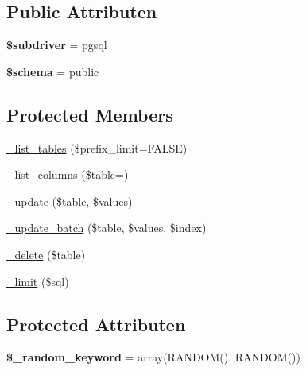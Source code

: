 \subsection*{Public Attributen}
\begin{DoxyCompactItemize}
\item 
\mbox{\label{class_c_i___d_b__pdo__pgsql__driver_a1322ca756348b11d080cb7a4f590de15}} 
{\bfseries \$subdriver} = \textquotesingle{}pgsql\textquotesingle{}
\item 
\mbox{\label{class_c_i___d_b__pdo__pgsql__driver_a83022b1d70799d2bde3d64dca9cb40ee}} 
{\bfseries \$schema} = \textquotesingle{}public\textquotesingle{}
\end{DoxyCompactItemize}
\subsection*{Protected Members}
\begin{DoxyCompactItemize}
\item 
\mbox{\hyperlink{class_c_i___d_b__pdo__pgsql__driver_a435c0f3ce54fe7daa178baa8532ebd54}{\+\_\+list\+\_\+tables}} (\$prefix\+\_\+limit=F\+A\+L\+SE)
\item 
\mbox{\hyperlink{class_c_i___d_b__pdo__pgsql__driver_a7ccb7f9c301fe7f0a9db701254142b63}{\+\_\+list\+\_\+columns}} (\$table=\textquotesingle{}\textquotesingle{})
\item 
\mbox{\hyperlink{class_c_i___d_b__pdo__pgsql__driver_a2540b03a93fa73ae74c10d0e16fc073e}{\+\_\+update}} (\$table, \$values)
\item 
\mbox{\hyperlink{class_c_i___d_b__pdo__pgsql__driver_a336b9ebb119e47b6a84bb7fc9d4dae93}{\+\_\+update\+\_\+batch}} (\$table, \$values, \$index)
\item 
\mbox{\hyperlink{class_c_i___d_b__pdo__pgsql__driver_a133ea8446ded52589bd22cc9163d0896}{\+\_\+delete}} (\$table)
\item 
\mbox{\hyperlink{class_c_i___d_b__pdo__pgsql__driver_a3a02ea06541b8ecc25a33a61651562c8}{\+\_\+limit}} (\$sql)
\end{DoxyCompactItemize}
\subsection*{Protected Attributen}
\begin{DoxyCompactItemize}
\item 
\mbox{\label{class_c_i___d_b__pdo__pgsql__driver_a10213aa6e05f6d924d3277bb1d2fea00}} 
{\bfseries \$\+\_\+random\+\_\+keyword} = array(\textquotesingle{}R\+A\+N\+D\+OM()\textquotesingle{}, \textquotesingle{}R\+A\+N\+D\+OM()\textquotesingle{})
\end{DoxyCompactItemize}


